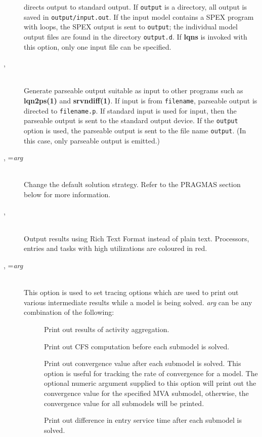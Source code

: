 \begin{description}
directs output to standard output.  If \texttt{output} is a directory, all output is saved in
\texttt{output/input.out}. If the input model contains a SPEX program with loops, the SPEX output is sent to
\texttt{output}; the individual model output files are found in the directory
\texttt{output.d}. If \textbf{lqns} is invoked with this
option, only one input file can be specified.
\item[\flag{p}{}, \longopt{parseable}]~\\
Generate parseable output suitable as input to other programs such as
\textbf{lqn2ps(1)} and \textbf{srvndiff(1)}.  If input is from
\texttt{filename}, parseable output is directed to \texttt{filename.p}.
If standard input is used for input, then the parseable output is sent
to the standard output device.  If the \texttt{output} option is used, the
parseable output is sent to the file name \texttt{output}.
(In this case, only parseable output is emitted.)
\item[\flag{P}{}, \longopt{pragma}=\emph{arg}]~\\
Change the default solution strategy.  Refer to the PRAGMAS section
below for more information.
\item[\flag{r}{}, \longopt{rtf}]~\\
Output results using Rich Text Format instead of plain text.  Processors, entries and tasks with high utilizations are coloured in red.
\item[\flag{t}{}, \longopt{trace}=\emph{arg}]~\\
This option is used to set tracing  options which are used to print out various
intermediate results  while a model is being solved.
\emph{arg} can be any combination of the following:
\begin{description}
\item[]
Print out results of activity aggregation.
\item[]
Print out CFS computation before each submodel is solved.
\item[]
Print out convergence value after each submodel is solved.
This option is useful for tracking the rate of convergence for a model.
The optional numeric argument supplied to this option will print out the convergence value for the specified MVA submodel, otherwise,
the convergence value for all submodels will be printed.
\item[]
Print out difference in entry service time after each submodel is solved.

\end{description}
\end{description}
